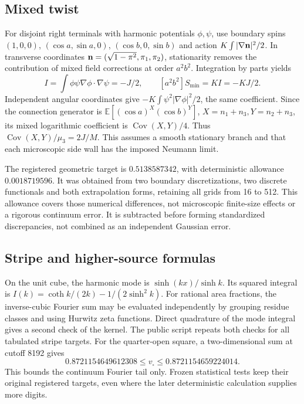 \documentclass[10pt,a4paper]{article}
\newcommand{\E}{\mathbb E}
\newcommand{\Cov}{\operatorname{Cov}}
\begin{document}
\subsection{Mixed twist}
For disjoint right terminals with harmonic potentials \(\phi,\psi\),
use boundary spins \((1,0,0)\), \((\cos a,\sin a,0)\),
\((\cos b,0,\sin b)\) and action \(K\int|\nabla{\bf n}|^2/2\).
In transverse coordinates
\({\bf n}=(\sqrt{1-\pi^2},\pi_1,\pi_2)\), stationarity removes the
contribution of mixed field corrections at order \(a^2b^2\).
Integration by parts yields
\[
I=\int\phi\psi\nabla\phi\cdot\nabla\psi=-J/2,\qquad
[a^2b^2]S_{\min}=KI=-KJ/2 .
\]
Independent angular coordinates give
\(-K\int\psi^2|\nabla\phi|^2/2\), the same coefficient.
Since the connection generator is
\(\E[(\cos a)^X(\cos b)^Y]\), \(X=n_1+n_3,Y=n_2+n_3\),
its mixed logarithmic coefficient is \(\Cov(X,Y)/4\).
Thus \(\Cov(X,Y)/\mu_3=2J/M\). This assumes a smooth stationary branch
and that each microscopic side wall has the imposed Neumann limit.

The registered geometric target is \(0.5138587342\), with deterministic
allowance \(0.0018719596\). It was obtained from two boundary
discretizations, two discrete functionals and both extrapolation forms,
retaining all grids from 16 to 512. This allowance covers those numerical
differences, not microscopic finite-size effects or a rigorous continuum
error. It is subtracted before forming standardized discrepancies, not
combined as an independent Gaussian error.

\subsection{Stripe and higher-source formulas}
On the unit cube, the harmonic mode is \(\sinh(kx)/\sinh k\).
Its squared integral is \(I(k)=\coth k/(2k)-1/(2\sinh^2k)\).
For rational area fractions, the inverse-cubic Fourier sum may be evaluated
independently by grouping residue classes and using Hurwitz zeta functions.
Direct quadrature of the mode integral gives a second check of the kernel.
The public script repeats both checks for all tabulated stripe targets.
For the quarter-open square, a two-dimensional sum at cutoff 8192 gives
\[
0.8721154649612308\le v_{\square}\le0.8721154659224014 .
\]
This bounds the continuum Fourier tail only. Frozen statistical tests keep
their original registered targets, even where the later deterministic
calculation supplies more digits.
\end{document}
